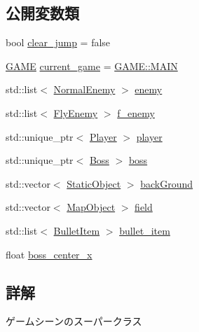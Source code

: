 \subsection*{公開変数類}
\begin{DoxyCompactItemize}
\item 
bool \mbox{\hyperlink{class_game_scene_base_af752b345d7711c43c8deafd6618bb62f}{clear\+\_\+jump}} = false
\item 
\mbox{\hyperlink{class_game_scene_base_a9e25ffb879e1347e9605badaa53518f3}{G\+A\+ME}} \mbox{\hyperlink{class_game_scene_base_aad639837dc3d0735e69052c980ec9f18}{current\+\_\+game}} = \mbox{\hyperlink{class_game_scene_base_a9e25ffb879e1347e9605badaa53518f3a186495f7da296bf880df3a22a492b378}{G\+A\+M\+E\+::\+M\+A\+IN}}
\item 
std\+::list$<$ \mbox{\hyperlink{class_normal_enemy}{Normal\+Enemy}} $>$ \mbox{\hyperlink{class_game_scene_base_a5203f71e49d0a65de546dce23670b39e}{enemy}}
\item 
std\+::list$<$ \mbox{\hyperlink{class_fly_enemy}{Fly\+Enemy}} $>$ \mbox{\hyperlink{class_game_scene_base_ad34ad8c64d483b662352b9a806634bd9}{f\+\_\+enemy}}
\item 
std\+::unique\+\_\+ptr$<$ \mbox{\hyperlink{class_player}{Player}} $>$ \mbox{\hyperlink{class_game_scene_base_a86d056176f172dc0115d00878956a741}{player}}
\item 
std\+::unique\+\_\+ptr$<$ \mbox{\hyperlink{class_boss}{Boss}} $>$ \mbox{\hyperlink{class_game_scene_base_a8de41f067f4a7ed1e41f60836ea1b1e5}{boss}}
\item 
std\+::vector$<$ \mbox{\hyperlink{class_static_object}{Static\+Object}} $>$ \mbox{\hyperlink{class_game_scene_base_a0c60c7b970f081b2eee1ac14d74f6a7e}{back\+Ground}}
\item 
std\+::vector$<$ \mbox{\hyperlink{class_map_object}{Map\+Object}} $>$ \mbox{\hyperlink{class_game_scene_base_a27a6d9806fd1f23a651a545c94a24254}{field}}
\item 
std\+::list$<$ \mbox{\hyperlink{class_bullet_item}{Bullet\+Item}} $>$ \mbox{\hyperlink{class_game_scene_base_a32ec936c873df49cdf1400deb60c6b7f}{bullet\+\_\+item}}
\item 
float \mbox{\hyperlink{class_game_scene_base_a1eebaf57ec13050f35ae29074f10c668}{boss\+\_\+center\+\_\+x}}
\end{DoxyCompactItemize}


\subsection{詳解}
ゲームシーンのスーパークラス 

